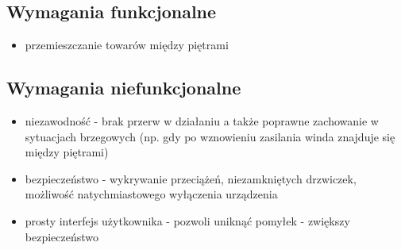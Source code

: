 \documentclass[a4paper,11pt]{article}
\begin{document}
\subsection{Wymagania funkcjonalne}
\begin{itemize}
\item przemieszczanie towarów między piętrami
\end{itemize}
\subsection{Wymagania niefunkcjonalne}
\begin{itemize}
\item niezawodność - brak przerw w działaniu a także poprawne zachowanie w sytuacjach brzegowych
(np. gdy po wznowieniu zasilania winda znajduje się między piętrami)
\item bezpieczeństwo - wykrywanie przeciążeń, niezamkniętych drzwiczek, możliwość natychmiastowego wyłączenia urządzenia 
\item prosty interfejs użytkownika - pozwoli uniknąć pomyłek - zwiększy bezpieczeństwo
\end{itemize}
\end{document}
